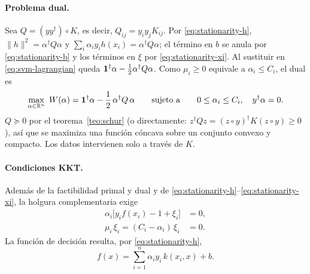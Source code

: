 \documentclass[11pt,a4paper]{article}
\newcommand{\R}{\mathbb{R}}
\newcommand{\dg}{\dagger}                         %
\newcommand{\norm}[1]{\lVert #1\rVert}
\theoremstyle{plain}
\theoremstyle{definition}
\theoremstyle{remark}
\numberwithin{equation}{section}
\begin{document}
\paragraph{Problema dual.} Sea $Q=(yy^{\dg})\circ K$, es decir, $Q_{ij}=y_iy_jK_{ij}$. Por
\eqref{eq:stationarity-h}, $\norm h^2=\alpha^{\dg}Q\alpha$ y
$\sum_i\alpha_iy_ih(x_i)=\alpha^{\dg}Q\alpha$; el término en $b$ se anula por
\eqref{eq:stationarity-b} y los términos en $\xi$ por \eqref{eq:stationarity-xi}. Al sustituir
en \eqref{eq:svm-lagrangian} queda $\ones^{\dg}\alpha-\frac12\alpha^{\dg}Q\alpha$. Como
$\mu_i\ge0$ equivale a $\alpha_i\le C_i$, el dual es
\begin{equation}\label{eq:svm-dual}
  \max_{\alpha\in\R^n}\ W(\alpha)=\ones^{\dg}\alpha-\frac12\,\alpha^{\dg}Q\,\alpha
  \qquad\text{sujeto a}\qquad0\le\alpha_i\le C_i,\quad y^{\dg}\alpha=0 .
\end{equation}
$Q\succeq0$ por el teorema~\ref{teo:schur} (o directamente:
$z^{\dg}Qz=(z\circ y)^{\dg}K(z\circ y)\ge0$), así que se maximiza una función cóncava sobre
un conjunto convexo y compacto. Los datos intervienen solo a través de $K$.

\paragraph{Condiciones KKT.} Además de la factibilidad primal y dual y de
\eqref{eq:stationarity-h}--\eqref{eq:stationarity-xi}, la holgura complementaria exige
\begin{align}
  \alpha_i\bigl[y_if(x_i)-1+\xi_i\bigr] &= 0, \label{eq:kkt-slack-alpha}\\
  \mu_i\,\xi_i=(C_i-\alpha_i)\,\xi_i &= 0 . \label{eq:kkt-slack-mu}
\end{align}
La función de decisión resulta, por \eqref{eq:stationarity-h},
\begin{equation}\label{eq:decision-function}
  f(x)=\sum_{i=1}^n\alpha_iy_i\,k(x_i,x)+b .
\end{equation}
\end{document}
